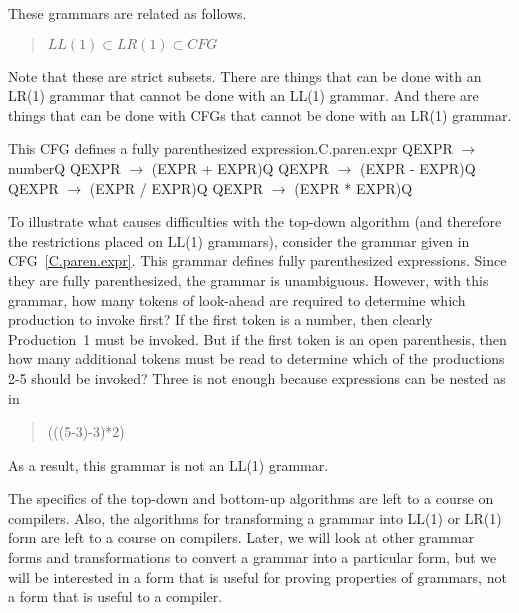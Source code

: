 \documentclass[letterpaper,12pt,openany,reqno]{book}%
\newcommand{\cfgprod}[2] {{\ttfamily #1} $\rightarrow$ {\ttfamily #2}}
\begin{document}
These grammars are related as follows.
\begin{quote}
$LL(1) \subset LR(1) \subset CFG$
\end{quote}
Note that these are strict subsets. There are things that can be done with an LR(1) grammar that cannot be done with an LL(1) grammar. And there are things that can be done with CFGs that cannot be done with an LR(1) grammar.

\begin{cfg}{This CFG defines a fully parenthesized expression.}{C.paren.expr}
Q\cfgprod{EXPR}{number}Q
Q\cfgprod{EXPR}{(EXPR + EXPR)}Q
Q\cfgprod{EXPR}{(EXPR - EXPR)}Q
Q\cfgprod{EXPR}{(EXPR / EXPR)}Q
Q\cfgprod{EXPR}{(EXPR * EXPR)}Q
\end{cfg}

To illustrate what causes difficulties with the top-down algorithm (and therefore the restrictions placed on LL(1) grammars), consider the grammar given in CFG~\ref{C.paren.expr}. This grammar defines fully parenthesized expressions. Since they are fully parenthesized, the grammar is unambiguous. However, with this grammar, how many tokens of look-ahead are required to determine which production to invoke first? If the first token is a number, then clearly Production~1 must be invoked. But if the first token is an open parenthesis, then how many additional tokens must be read to determine which of the productions 2-5 should be invoked? Three is not enough because expressions can be nested as in 
\begin{quote}
(((5-3)-3)*2)
\end{quote}
As a result, this grammar is not an LL(1) grammar.

The specifics of the top-down and bottom-up algorithms are left to a course on compilers. Also, the algorithms for transforming a grammar into LL(1) or LR(1) form are left to a course on compilers. Later, we will look at other grammar forms and transformations to convert a grammar into a particular form, but we will be interested in a form that is useful for proving properties of grammars, not a form that is useful to a compiler.
\end{document}
